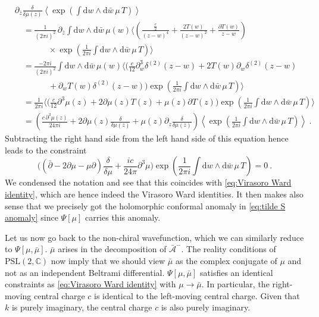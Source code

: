 \documentclass[12pt,a4paper]{article}
\newcommand{\be}{\begin{equation}}
\newcommand{\ee}{\end{equation}}
\newcommand\PSL{\text{PSL}}
\newcommand\CC{\mathbb{C}}
\renewcommand\d{\text{d}}
\begin{document}
\begin{align}
    &\partial_{\bar{z}} \frac{\delta}{\delta \mu(z)} \left \langle \exp\left( \int \d w \wedge \d \bar{w}\, \mu\, T\right) \right \rangle\nonumber\\
    &\quad=\frac{1}{(2\pi i)^2}\,  \partial_{\bar{z}} \int \d w \wedge \d \bar{w}\, \mu(w) \bigg \langle\!\!\left(\frac{\frac{c}{2}}{(z-w)^4}+\frac{2 T(w)}{(z-w)^2}+\frac{\partial T(w)}{z-w} \right) \nonumber\\
    &\qquad\qquad\times \exp\left(\frac{1}{2\pi i} \int \d w \wedge \d \bar{w}\, \mu\, T\right)\!\!\bigg \rangle \nonumber\\
    &\quad=\frac{-2\pi i}{(2\pi i)^2}  \int \d w \wedge \d \bar{w}\,\mu(w) \bigg \langle\!\Big(\frac{c}{12} \partial_w^3\delta^{(2)}(z-w)+2 T(w)\partial_w \delta^{(2)}(z-w)\nonumber\\
    &\qquad\qquad+\partial_w T(w)\delta^{(2)}(z-w) \Big) \exp\left(\frac{1}{2\pi i} \int \d w \wedge \d \bar{w}\, \mu\, T\right)\!\!\bigg \rangle \nonumber\\
    &\quad=\frac{1}{2\pi i}\bigg\langle \!\Big(\frac{c}{12} \partial^3 \mu(z)+2 \partial \mu(z) T(z)+\mu(z) \partial T(z)\Big)  \exp\left(\frac{1}{2\pi i} \int \d w \wedge \d \bar{w}\, \mu\, T\right)\!\!\bigg \rangle \nonumber \\
    &\quad=\left(\frac{c\, \partial^3 \mu(z)}{24 \pi i} +2 \partial \mu(z) \frac{\delta}{\delta \mu(z)}+\mu(z) \partial_z \frac{\delta}{\delta \mu(z)}\right)\left\langle \exp\left(\frac{1}{2\pi i} \int \d w \wedge \d \bar{w}\, \mu\, T\right)\right \rangle ~.
\end{align}
Subtracting the right hand side from the left hand side of this equation hence leads to the constraint 
\be 
\bigg((\bar{\partial}-2 \partial \mu-\mu \partial) \frac{\delta}{\delta \mu}+\frac{i c}{24\pi} \partial^3 \mu\bigg) \exp\left(\frac{1}{2\pi i} \int \d w \wedge \d \bar{w}\, \mu\, T\right)=0~.
\ee
We condensed the notation and see that this coincides with \eqref{eq:Virasoro Ward identity}, which are hence indeed the Virasoro Ward identities. 
It then makes also sense that we precisely got the holomorphic conformal anomaly in \eqref{eq:tilde S anomaly} since $\Psi[\mu]$ carries this anomaly.

Let us now go back to the non-chiral wavefunction, which we can similarly reduce to $\Psi[\mu,\bar{\mu}]$. $\bar{\mu}$ arises in the decomposition of $\bar{\mathcal{A}}^-$. The reality conditions of $\PSL(2,\CC)$ now imply that we should view $\bar{\mu}$ as the complex conjugate of $\mu$ and not as an independent Beltrami differential.
$\Psi[\mu,\bar{\mu}]$ satisfies an identical constraints as \eqref{eq:Virasoro Ward identity} with $\mu \to \bar{\mu}$. In particular, the right-moving central charge $c$ is identical to the left-moving central charge. Given that $k$ is purely imaginary, the central charge $c$ is also purely imaginary.
\end{document}
